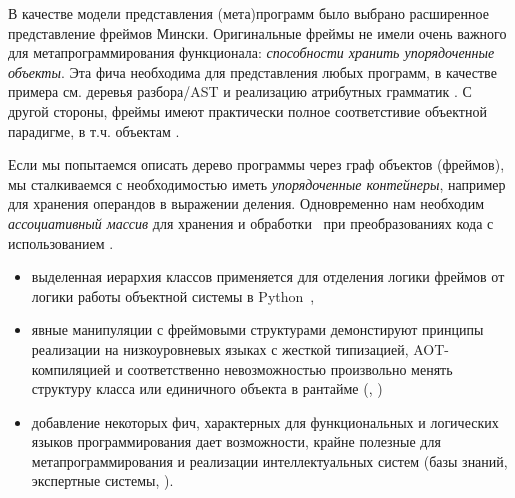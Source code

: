 
В качестве модели представления (мета)программ было выбрано расширенное
представление фреймов Мински. Оригинальные фреймы не имели очень важного для
метапрограммирования функционала: \textit{способности хранить упорядоченные
объекты}. Эта фича необходима для представления любых
программ, в качестве примера см. деревья разбора/AST и реализацию атрибутных
грамматик \cite{dragon2}. С другой стороны, фреймы имеют практически полное
соответстивие объектной парадигме, в т.ч. объектам \py.

Если мы попытаемся описать дерево программы через граф объектов (фреймов), мы
сталкиваемся с необходимостью иметь \emph{упорядоченные контейнеры}, например
для хранения операндов в выражении деления. Одновременно нам необходим
\emph{ассоциативный массив} для хранения и обработки \ при
преобразованиях кода с использованием .

\clearpage
\begin{itemize}
  \item 
выделенная иерархия классов применяется для отделения логики фреймов от логики
работы объектной системы в Python\ ,
  \item 
явные манипуляции с фреймовыми структурами демонстируют принципы реализации на
низкоуровневых языках с жесткой типизацией, AOT-компиляцией и соответственно
невозможностью произвольно менять структуру класса или единичного объекта в
рантайме (\cpp, \java)
  \item 
добавление некоторых фич, характерных для функциональных и логических языков 
программирования 
дает возможности, крайне полезные для метапрограммирования и реализации
интеллектуальных систем (базы знаний, экспертные системы, ).
\end{itemize}

\clearpage
{}
 
